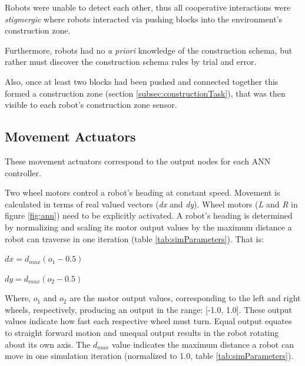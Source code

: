 Robots were unable to detect each other, thus all cooperative interactions were \textit{stigmergic} \cite{BeckersHollandDeneubourg1994}
where robots interacted via pushing blocks into the environment's construction zone.

Furthermore, robots had no \textit{a priori} knowledge of the construction schema,
but rather must discover the construction schema rules by trial and error.

Also, once at least two blocks had been pushed and connected together this formed a construction zone (section \ref{subsec:constructionTask}),
that was then visible to each robot's construction zone sensor.

\subsection{Movement Actuators}

These movement actuators correspond to the output nodes for each ANN controller.

Two wheel motors control a robot's heading at constant speed.
Movement is calculated in terms of real valued vectors (\textit{dx}
and \textit{dy}).  Wheel motors (\textit{L} and \textit{R} in figure \ref{fig:ann})
need to be explicitly activated.
A robot's heading is determined by normalizing and scaling its motor
output values by the maximum distance a robot can traverse in one
iteration (table \ref{tab:simParameters}).  That is:

$\textit{dx} = d_{max} (o_{1} - 0.5)$

$\textit{dy} = d_{max} (o_{2} - 0.5)$

Where, $o_{1}$ and $o_{2}$ are the motor output values, corresponding
to the left and right wheels, respectively, producing an output in the range:
[-1.0, 1.0].
These output values indicate how fast each respective wheel must turn.
Equal output equates to straight forward motion and unequal output results
in the robot rotating about its own axis.
The $d_{max}$ value indicates the maximum distance a robot can move in
one simulation iteration (normalized to 1.0, table \ref{tab:simParameters}).



